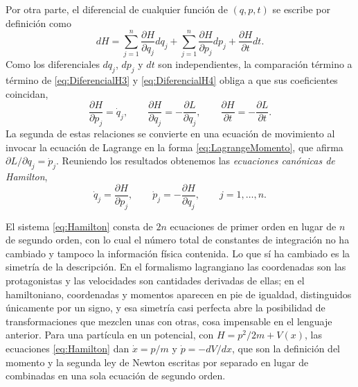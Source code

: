         Por otra parte, el diferencial de cualquier función de $(q,p,t)$ se escribe por definición como
        \begin{equation}\label{eq:DiferencialH4}
            dH = \sum_{j=1}^{n}\frac{\partial H}{\partial q_{j}}dq_{j} + \sum_{j=1}^{n}\frac{\partial H}{\partial p_{j}}dp_{j} + \frac{\partial H}{\partial t}dt .
        \end{equation}
        Como los diferenciales $dq_{j}$, $dp_{j}$ y $dt$ son independientes, la comparación término a término de \eqref{eq:DiferencialH3} y \eqref{eq:DiferencialH4} obliga a que sus coeficientes coincidan,
        \begin{equation}\label{eq:ComparacionCoef}
            \frac{\partial H}{\partial p_{j}} = \dot{q}_{j},
            \qquad
            \frac{\partial H}{\partial q_{j}} = -\frac{\partial L}{\partial q_{j}},
            \qquad
            \frac{\partial H}{\partial t} = -\frac{\partial L}{\partial t} .
        \end{equation}
        La segunda de estas relaciones se convierte en una ecuación de movimiento al invocar la ecuación de Lagrange en la forma \eqref{eq:LagrangeMomento}, que afirma $\partial L/\partial q_{j} = \dot{p}_{j}$. Reuniendo los resultados obtenemos las \textit{ecuaciones canónicas de Hamilton},
        \begin{equation}\label{eq:Hamilton}
            \boxed{\;\dot{q}_{j} = \frac{\partial H}{\partial p_{j}},
            \qquad
            \dot{p}_{j} = -\frac{\partial H}{\partial q_{j}},
            \qquad j = 1,\ldots,n .\;}
        \end{equation}

        El sistema \eqref{eq:Hamilton} consta de $2n$ ecuaciones de primer orden en lugar de $n$ de segundo orden, con lo cual el número total de constantes de integración no ha cambiado y tampoco la información física contenida. Lo que sí ha cambiado es la simetría de la descripción. En el formalismo lagrangiano las coordenadas son las protagonistas y las velocidades son cantidades derivadas de ellas; en el hamiltoniano, coordenadas y momentos aparecen en pie de igualdad, distinguidos únicamente por un signo, y esa simetría casi perfecta abre la posibilidad de transformaciones que mezclen unas con otras, cosa impensable en el lenguaje anterior. Para una partícula en un potencial, con $H = p^{2}/2m + V(x)$, las ecuaciones \eqref{eq:Hamilton} dan $\dot{x} = p/m$ y $\dot{p} = -dV/dx$, que son la definición del momento y la segunda ley de Newton escritas por separado en lugar de combinadas en una sola ecuación de segundo orden.

